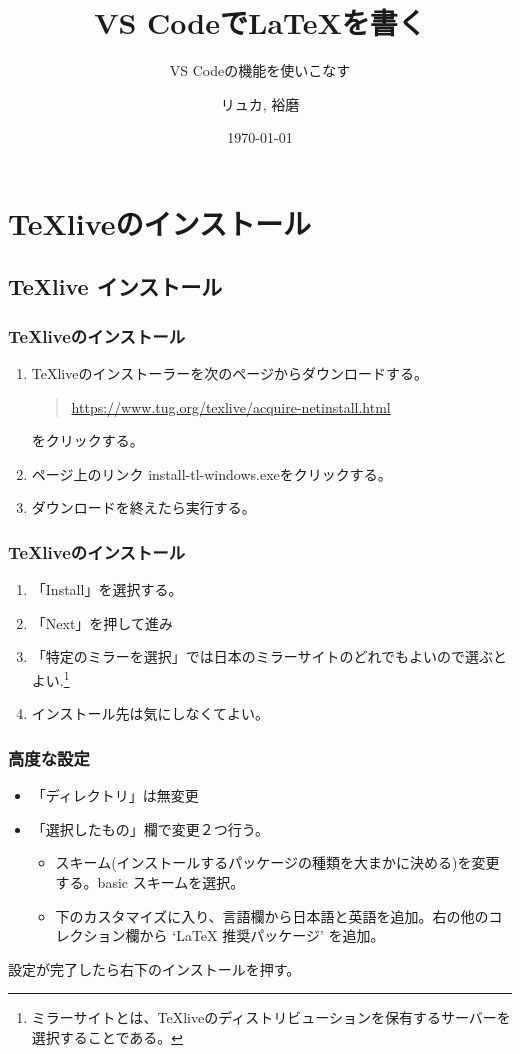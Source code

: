 \documentclass{beamer}
\title{VS Codeで\LaTeX を書く}
\subtitle{VS Codeの機能を使いこなす}
\author{リュカ, 裕磨}
\institute{ゼロイチゼミ, 学術サーバー}
\date{\today}
\begin{document}
\begin{frame}
  \titlepage
\end{frame}

\section{TeXliveのインストール}
\subsection{TeXlive インストール}

\begin{frame}
  \frametitle{TeXliveのインストール}
  \begin{enumerate}
	\item TeXliveのインストーラーを次のページからダウンロードする。
  \begin{quote}
    \centering
    \url{https://www.tug.org/texlive/acquire-netinstall.html}
  \end{quote}
  をクリックする。
  \item ページ上のリンク install-tl-windows.exeをクリックする。
  \item ダウンロードを終えたら実行する。
\end{enumerate}

\end{frame}


\begin{frame}
  \frametitle{TeXliveのインストール}
  \begin{enumerate}
    \item 「Install」を選択する。
    \item  「Next」を押して進み
    \item 「特定のミラーを選択」では日本のミラーサイトのどれでもよいので選ぶとよい.\footnote{ミラーサイトとは、TeXliveのディストリビューションを保有するサーバーを選択することである。}
    \item インストール先は気にしなくてよい。
  \end{enumerate}

  

\end{frame}

\begin{frame}
  \frametitle{高度な設定}

  \begin{itemize}
    \item 「ディレクトリ」は無変更
    \item 「選択したもの」欄で変更２つ行う。
    \begin{itemize}
      \item スキーム(インストールするパッケージの種類を大まかに決める)を変更する。basic スキームを選択。
      \item 下のカスタマイズに入り、言語欄から日本語と英語を追加。右の他のコレクション欄から `LaTeX 推奨パッケージ' を追加。
    \end{itemize}
  \end{itemize}

  設定が完了したら右下のインストールを押す。
\end{frame}
\end{document}
